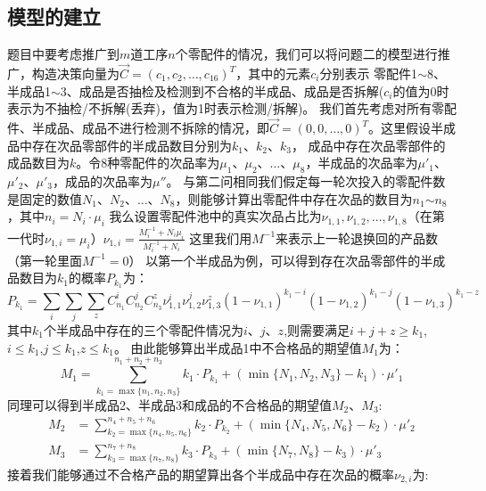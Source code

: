 \documentclass[withoutpreface,bwprint]{cumcmthesis} %
\begin{document}
\subsection{模型的建立}
题目中要考虑推广到$m$道工序$n$个零配件的情况，我们可以将问题二的模型进行推广，构造决策向量为$\vec{C}=(c_{1},c_{2},\dots,c_{16})^{T}$，其中的元素$c_i$分别表示
零配件1$\sim$8、半成品1$\sim$3、成品是否抽检及检测到不合格的半成品、成品是否拆解($c_{i}$的值为0时表示为不抽检/不拆解(丢弃)，值为1时表示检测/拆解)。
我们首先考虑对所有零配件、半成品、成品不进行检测不拆除的情况，即$\vec{C}=(0,0,\dots,0)^{T}$。这里假设半成品中存在次品零部件的半成品数目分别为$k_{1}$、$k_{2}$、$k_{3}$，
成品中存在次品零部件的成品数目为$k$。令8种零配件的次品率为$\mu_{1}$、$\mu_{2}$、$\dots$、$\mu_{8}$，半成品的次品率为$\mu'_{1}$、$\mu'_{2}$、$\mu'_{3}$，成品的次品率为$\mu''$。
与第二问相同我们假定每一轮次投入的零配件数是固定的数值$N_{1}$、$N_{2}$、$\dots$、$N_{8}$，则能够计算出零配件中存在次品的数目为$n_{1}$$\sim$$n_{8}$，其中$n_{i}=N_{i}\cdot\mu_{i}$
我么设置零配件池中的真实次品占比为$\nu_{1,1},\nu_{1,2},\dots,\nu_{1,8}$（在第一代时$\nu_{1,i}=\mu_{i}$）$\nu_{1,i}=\frac{M_{i}^{-1}+N_{i}\mu_{i}}{M_{i}^{-1}+N_{i}}$
这里我们用$M^{-1}$来表示上一轮退换回的产品数（第一轮里面$M^{-1}=0$）
以第一个半成品为例，可以得到存在次品零部件的半成品数目为$k_{1}$的概率$P_{k_{1}}$为：
\begin{equation}
	P_{k_{1}}=\sum_{i}\sum_{j}\sum_{z}C_{n_{1}}^{i}C_{n_{2}}^{j}C_{n_{3}}^{z}\nu_{1,1}^{i}\nu_{1,2}^{j}\nu_{1,3}^{z}(1-\nu_{1,1})^{k_{1}-i}(1-\nu_{1,2})^{k_{1}-j}(1-\nu_{1,3})^{k_{1}-z}
	\label{eq:6}
\end{equation}
其中$k_{1}$个半成品中存在的三个零配件情况为$i$、$j$、$z$,则需要满足$i+j+z \ge k_{1}$,$i\le k_{1}$,$j\le k_{1}$,$z\le k_{1}$。
由此能够算出半成品1中不合格品的期望值$M_{1}$为：
\begin{equation}
	M_{1}=\sum_{k_{1}=\max \{n_{1},n_{2},n_{3}\}}^{n_{1}+n_{2}+n_{3}}k_{1}\cdot P_{k_{1}}+(\min \{N_{1},N_{2},N_{3}\}-k_{1})\cdot \mu'_{1}
	\label{eq:7}
\end{equation}
同理可以得到半成品2、半成品3和成品的不合格品的期望值$M_{2}$、$M_{3}$:
\begin{align}
	M_{2}&=\sum_{k_{2}=\max \{n_{4},n_{5},n_{6}\}}^{n_{4}+n_{5}+n_{6}}k_{2}\cdot P_{k_{2}}+(\min \{N_{4},N_{5},N_{6}\}-k_{2})\cdot \mu'_{2} \\
	M_{3}&=\sum_{k_{3}=\max \{n_{7},n_{8}\}}^{n_{7}+n_{8}}k_{3}\cdot P_{k_{3}}+(\min \{N_{7},N_{8}\}-k_{3})\cdot \mu'_{3} 
	\label{eq:8}
\end{align}
接着我们能够通过不合格产品的期望算出各个半成品中存在次品的概率$\nu_{2,i}$为:
\end{document}

